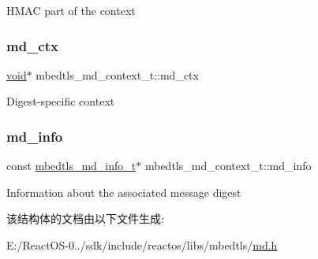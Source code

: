 H\+M\+AC part of the context \mbox{\label{structmbedtls__md__context__t_af7dc1e93cbd6f9a3c52d1a5064732fe1}} 
\subsubsection{\texorpdfstring{md\+\_\+ctx}{md\_ctx}}
{\footnotesize\ttfamily \hyperlink{interfacevoid}{void}$\ast$ mbedtls\+\_\+md\+\_\+context\+\_\+t\+::md\+\_\+ctx}

Digest-\/specific context \mbox{\label{structmbedtls__md__context__t_a946ec8104697a039cf1990233cd41b28}} 
\subsubsection{\texorpdfstring{md\+\_\+info}{md\_info}}
{\footnotesize\ttfamily const \hyperlink{structmbedtls__md__info__t}{mbedtls\+\_\+md\+\_\+info\+\_\+t}$\ast$ mbedtls\+\_\+md\+\_\+context\+\_\+t\+::md\+\_\+info}

Information about the associated message digest 

该结构体的文档由以下文件生成\+:\begin{DoxyCompactItemize}
\item 
E\+:/\+React\+O\+S-\/0../sdk/include/reactos/libs/mbedtls/\hyperlink{md_8h}{md.\+h}\end{DoxyCompactItemize}

